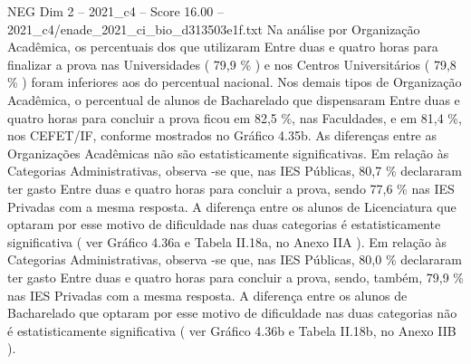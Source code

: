 \begin{textsample}{NEG Dim 2 – 2021\_c4 – Score 16.00 – 2021\_c4/enade\_2021\_ci\_bio\_d313503e1f.txt}
Na análise por Organização Acadêmica, os percentuais dos que utilizaram Entre duas e quatro horas para finalizar a prova nas Universidades ( 79,9 \% ) e nos Centros Universitários ( 79,8 \% ) foram inferiores aos do percentual nacional.
Nos demais tipos de Organização Acadêmica, o percentual de alunos de Bacharelado que dispensaram Entre duas e quatro horas para concluir a prova ficou em 82,5 \%, nas Faculdades, e em 81,4 \%, nos CEFET/IF, conforme mostrados no Gráfico 4.35b.
As diferenças entre as Organizações Acadêmicas não são estatisticamente significativas.
Em relação às Categorias Administrativas, observa -se que, nas IES Públicas, 80,7 \% declararam ter gasto Entre duas e quatro horas para concluir a prova, sendo 77,6 \% nas IES Privadas com a mesma resposta.
A diferença entre os alunos de Licenciatura que optaram por esse motivo de dificuldade nas duas categorias é estatisticamente significativa ( ver Gráfico 4.36a e Tabela II.18a, no Anexo IIA ).
Em relação às Categorias Administrativas, observa -se que, nas IES Públicas, 80,0 \% declararam ter gasto Entre duas e quatro horas para concluir a prova, sendo, também, 79,9 \% nas IES Privadas com a mesma resposta.
A diferença entre os alunos de Bacharelado que optaram por esse motivo de dificuldade nas duas categorias não é estatisticamente significativa ( ver Gráfico 4.36b e Tabela II.18b, no Anexo IIB ).

\end{textsample}

